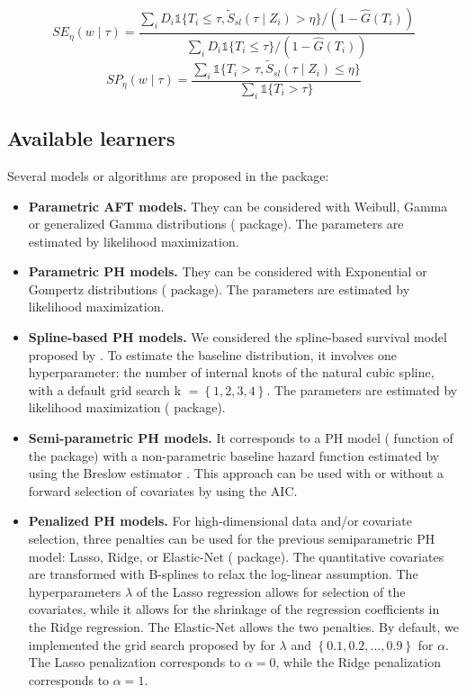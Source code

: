 \[ SE_\eta(w \mid \tau) = \frac{ \sum_i D_i \mathbb{1}\lbrace T_i \leq \tau , \tilde{S}_{sl}( \tau \mid Z_i) > \eta \rbrace / (1 - \hat{G}(T_i)) }{ \sum_i D_i \mathbb{1}\lbrace T_i \leq \tau \rbrace / (1 - \hat{G}(T_i))}\]
\[SP_\eta(w \mid \tau) = \frac{ \sum_i  \mathbb{1}\lbrace T_i > \tau , \tilde{S}_{sl}( \tau \mid Z_i) \leq \eta \rbrace }{ \sum_i \mathbb{1}\lbrace T_i > \tau \rbrace } \]

\hypertarget{available-learners}{%
\subsection{Available learners}\label{available-learners}}

Several models or algorithms are proposed in the  package:

\begin{itemize}
\item
  \textbf{Parametric AFT models.} They can be considered with Weibull, Gamma or generalized Gamma distributions ( package). The parameters are estimated by likelihood maximization.
\item
  \textbf{Parametric PH models.} They can be considered with Exponential or Gompertz distributions ( package). The parameters are estimated by likelihood maximization.
\item
  \textbf{Spline-based PH models.} We considered the spline-based survival model proposed by \citet{royston_flexible_2002}. To estimate the baseline distribution, it involves one hyperparameter: the number of internal knots of the natural cubic spline, with a default grid search \textsf{k} \(= \left \lbrace 1, 2, 3, 4 \right \rbrace\). The parameters are estimated by likelihood maximization ( package).
\item
  \textbf{Semi-parametric PH models.} It corresponds to a PH model ( function of the  package) with a non-parametric baseline hazard function estimated by using the Breslow estimator \citep{linBreslowEstimator2007}. This approach can be used with or without a forward selection of covariates by using the AIC.
\item
  \textbf{Penalized PH models.} For high-dimensional data and/or covariate selection, three penalties can be used for the previous semiparametric PH model: Lasso, Ridge, or Elastic-Net ( package). The quantitative covariates are transformed with B-splines to relax the log-linear assumption. The hyperparameters \(\lambda\) of the Lasso regression allows for selection of the covariates, while it allows for the shrinkage of the regression coefficients in the Ridge regression. The Elastic-Net allows the two penalties. By default, we implemented the grid search proposed by \citet{simon_2011_ElasticNet_Cox} for \(\lambda\) and \(\left \lbrace 0.1, 0.2, ..., 0.9 \right \rbrace\) for \(\alpha\). The Lasso penalization corresponds to \(\alpha=0\), while the Ridge penalization corresponds to \(\alpha=1\).

\end{itemize}
